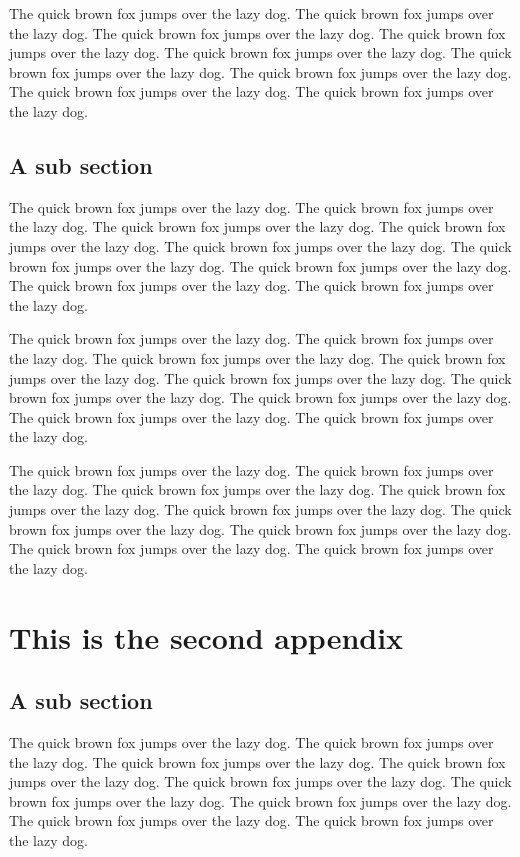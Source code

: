 \documentclass[openany,twoside,12pt]{book}
\theoremstyle{plain}
\numberwithin{equation}{chapter}
\numberwithin{figure}{chapter}
\numberwithin{table}{chapter}
\begin{document}
The quick brown fox jumps over the lazy dog. The quick brown fox jumps over the lazy dog. The quick brown fox jumps over the lazy dog. The quick brown fox jumps over the lazy dog. The quick brown fox jumps over the lazy dog. The quick brown fox jumps over the lazy dog. The quick brown fox jumps over the lazy dog. The quick brown fox jumps over the lazy dog. The quick brown fox jumps over the lazy dog.

\section{A sub section}

The quick brown fox jumps over the lazy dog. The quick brown fox jumps over the lazy dog. The quick brown fox jumps over the lazy dog. The quick brown fox jumps over the lazy dog. The quick brown fox jumps over the lazy dog. The quick brown fox jumps over the lazy dog. The quick brown fox jumps over the lazy dog. The quick brown fox jumps over the lazy dog. The quick brown fox jumps over the lazy dog.

The quick brown fox jumps over the lazy dog. The quick brown fox jumps over the lazy dog. The quick brown fox jumps over the lazy dog. The quick brown fox jumps over the lazy dog. The quick brown fox jumps over the lazy dog. The quick brown fox jumps over the lazy dog. The quick brown fox jumps over the lazy dog. The quick brown fox jumps over the lazy dog. The quick brown fox jumps over the lazy dog.


The quick brown fox jumps over the lazy dog. The quick brown fox jumps over the lazy dog. The quick brown fox jumps over the lazy dog. The quick brown fox jumps over the lazy dog. The quick brown fox jumps over the lazy dog. The quick brown fox jumps over the lazy dog. The quick brown fox jumps over the lazy dog. The quick brown fox jumps over the lazy dog. The quick brown fox jumps over the lazy dog.



\chapter{This is the second appendix}
\section{A sub section}

The quick brown fox jumps over the lazy dog. The quick brown fox jumps over the lazy dog. The quick brown fox jumps over the lazy dog. The quick brown fox jumps over the lazy dog. The quick brown fox jumps over the lazy dog. The quick brown fox jumps over the lazy dog. The quick brown fox jumps over the lazy dog. The quick brown fox jumps over the lazy dog. The quick brown fox jumps over the lazy dog.
\end{document}

